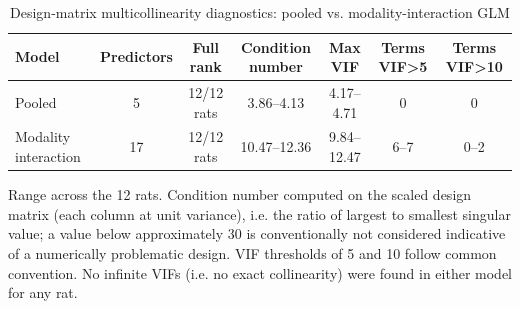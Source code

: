 \begin{table}[htbp]
\centering
\caption{Design-matrix multicollinearity diagnostics: pooled vs. modality-interaction GLM}
\label{tab:vif-matrix-summary}
\begin{tabular}{lcccccc}
\toprule
Model & Predictors & Full rank & Condition number & Max VIF & Terms VIF\textgreater5 & Terms VIF\textgreater10 \\
\midrule
Pooled & 5 & 12/12 rats & 3.86--4.13 & 4.17--4.71 & 0 & 0 \\
Modality interaction & 17 & 12/12 rats & 10.47--12.36 & 9.84--12.47 & 6--7 & 0--2 \\
\bottomrule
\end{tabular}
\vspace{4pt}
\par\noindent
\begin{minipage}{\linewidth}\small Range across the 12 rats. Condition number computed on the scaled design matrix (each column at unit variance), i.e. the ratio of largest to smallest singular value; a value below approximately 30 is conventionally not considered indicative of a numerically problematic design. VIF thresholds of 5 and 10 follow common convention. No infinite VIFs (i.e. no exact collinearity) were found in either model for any rat.\end{minipage}
\end{table}
